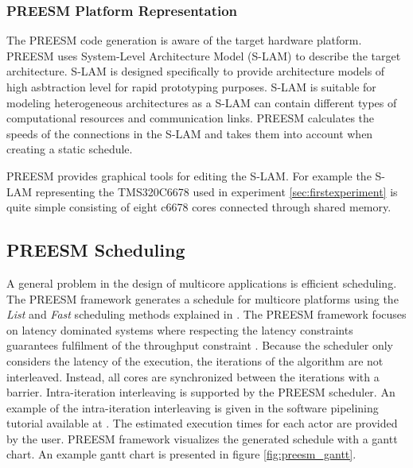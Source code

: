 \subsubsection{PREESM Platform Representation}
The PREESM code generation is aware of the target hardware platform. PREESM uses System-Level Architecture Model (S-LAM) \cite{pelcat2009system} to describe the target architecture. S-LAM is designed specifically to provide architecture models of high asbtraction level for rapid prototyping purposes. S-LAM is suitable for modeling heterogeneous architectures as a S-LAM can contain different types of computational resources and communication links. PREESM calculates the speeds of the connections in the S-LAM and takes them into account when creating a static schedule. \cite{pelcat2009system}

PREESM provides graphical tools for editing the S-LAM. For example the S-LAM representing the TMS320C6678 used in experiment \ref{sec:firstexperiment} is quite simple consisting of eight c6678 cores connected through shared memory.

\subsection{PREESM Scheduling}
\label{sec:preesmsched}
A general problem in the design of multicore applications is efficient scheduling. The PREESM framework generates a schedule for multicore platforms using the \textit{List} and \textit{Fast} scheduling methods explained in \cite{kwok1997high}. The PREESM framework focuses on latency dominated systems where respecting the latency constraints guarantees fulfilment of the throughput constraint \cite{pelcat2014preesm, ghamarian2006throughput}. Because the scheduler only considers the latency of the execution, the iterations of the algorithm are not interleaved. Instead, all cores are synchronized between the iterations with a barrier. Intra-iteration interleaving is supported by the PREESM scheduler. \cite{pelcat2014preesm} An example of the intra-iteration interleaving is given in the software pipelining tutorial available at \cite{preesm}. The estimated execution times for each actor are provided by the user. PREESM framework visualizes the generated schedule with a gantt chart. An example gantt chart is presented in figure \ref{fig:preesm_gantt}.\\ 
